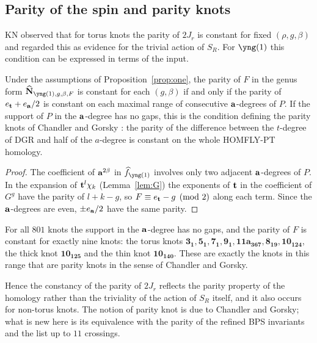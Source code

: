 \subsection{Parity of the spin and parity knots}
KN observed that for torus knots the parity of $2J_r$ is constant for fixed $(\rho,g,\beta)$ and regarded this as evidence for the trivial action of $S_R$.
For $\yng(1)$ this condition can be expressed in terms of the input.
\begin{proposition}\label{prop:parity}
Under the assumptions of Proposition~\ref{prop:one}, the parity of $F$ in the genus form $\hbN_{\yng(1),g,\beta,F}$ is constant for each $(g,\beta)$ if and only if
the parity of $e_{\mathbf{t}}+e_{\mathbf{a}}/2$ is constant on each maximal range of consecutive $\mathbf{a}$-degrees of $P$.
If the support of $P$ in the $\mathbf{a}$-degree has no gaps, this is the condition defining the parity knots of Chandler and Gorsky \cite{Chandler22}:
the parity of the difference between the $t$-degree of DGR and half of the $a$-degree is constant on the whole HOMFLY-PT homology.
\end{proposition}
\begin{proof}
The coefficient of $\mathbf{a}^{2\beta}$ in $\hf_{\yng(1)}$ involves only two adjacent $\mathbf{a}$-degrees of $P$.
In the expansion of $\mathbf{t}^l\chi_k$ (Lemma~\ref{lem:G}) the exponents of $\mathbf{t}$ in the coefficient of $G^g$ have the parity of $l+k-g$, so $F\equiv e_{\mathbf{t}}-g \pmod 2$ along each term.
Since the $\mathbf{a}$-degrees are even, $\pm e_{\mathbf{a}}/2$ have the same parity.
\end{proof}
\begin{compresult}\label{cr:parity}
For all $801$ knots the support in the $\mathbf{a}$-degree has no gaps, and the parity of $F$ is constant for exactly nine knots:
the torus knots $\mathbf{3_1},\mathbf{5_1},\mathbf{7_1},\mathbf{9_1},\mathbf{11a_{367}},\mathbf{8_{19}},\mathbf{10_{124}}$, the thick knot $\mathbf{10_{125}}$ and the thin knot $\mathbf{10_{140}}$.
These are exactly the knots in this range that are parity knots in the sense of Chandler and Gorsky.
\end{compresult}
Hence the constancy of the parity of $2J_r$ reflects the parity property of the homology rather than the triviality of the action of $S_R$ itself, and it also occurs for non-torus knots.
The notion of parity knot is due to Chandler and Gorsky; what is new here is its equivalence with the parity of the refined BPS invariants and the list up to $11$ crossings.
